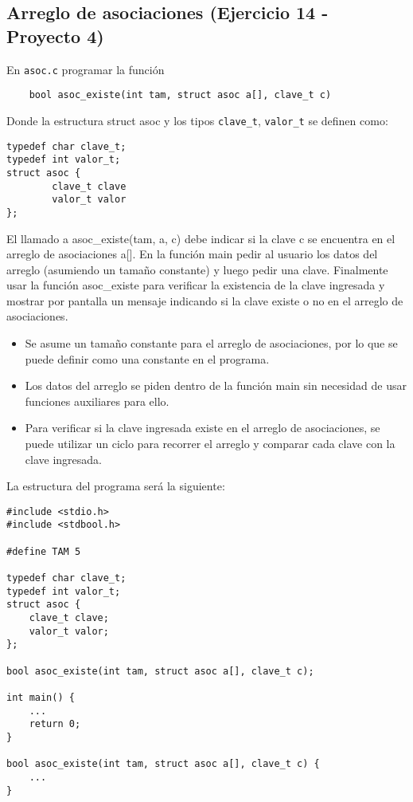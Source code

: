 \documentclass{article}
\begin{document}
\subsection{Arreglo de asociaciones (Ejercicio 14 - Proyecto 4)}
En \texttt{asoc.c} programar la función
\begin{verbatim}
    bool asoc_existe(int tam, struct asoc a[], clave_t c)
\end{verbatim}
Donde la estructura struct asoc y los tipos \texttt{clave\_t}, \texttt{valor\_t} se definen como:
\begin{verbatim}
typedef char clave_t;
typedef int valor_t;
struct asoc {
        clave_t clave
        valor_t valor
};
\end{verbatim}
El llamado a asoc\_existe(tam, a, c) debe indicar si la clave c se encuentra en el arreglo
de asociaciones a[]. En la función main pedir al usuario los datos del arreglo (asumiendo un
tamaño constante) y luego pedir una clave. Finalmente usar la función asoc\_existe para
verificar la existencia de la clave ingresada y mostrar por pantalla un mensaje indicando si la
clave existe o no en el arreglo de asociaciones. 
\begin{itemize}
    \item Se asume un tamaño constante para el arreglo de asociaciones, por lo que se puede definir como una constante en el programa.
    \item Los datos del arreglo se piden dentro de la función main sin necesidad de usar funciones auxiliares para ello.
    \item Para verificar si la clave ingresada existe en el arreglo de asociaciones, se puede utilizar un ciclo para recorrer el arreglo y comparar cada clave con la clave ingresada.
\end{itemize}

La estructura del programa será la siguiente:
\begin{verbatim}
#include <stdio.h>
#include <stdbool.h>

#define TAM 5

typedef char clave_t;
typedef int valor_t;
struct asoc {
    clave_t clave;
    valor_t valor;
};

bool asoc_existe(int tam, struct asoc a[], clave_t c);

int main() {
    ...
    return 0;
}

bool asoc_existe(int tam, struct asoc a[], clave_t c) {
    ...
}

\end{verbatim}
\end{document}
